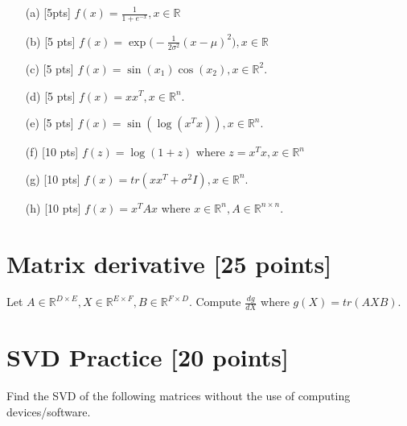 \begin{enumerate}
	\item [(a)] [5pts]  $f(x) = \frac{1}{1+e^{-x}}, x \in \mathbb{R}$
	
	\vspace{2mm} 

	\item[(b)]  [5 pts]  $f(x)= \exp \Big(-\frac{1}{2\sigma^2} (x-\mu)^2 \Big), x \in \mathbb{R}$
	
 
	 

	\item[(c)]  [5 pts]   $f(x)= \sin (x_1) \cos (x_2), x \in \mathbb{R}^2$.
	
	
	
	\item[(d)]  [5 pts]    $f(x) = xx^T, x \in \mathbb{R}^n$.

	\item[(e)]  [5 pts]    $f(x) = \sin( \log (x^T x)), x \in \mathbb{R}^n$.  
 
 	\item[(f)]  [10 pts]    $f(z)=\log(1+z)$ where $z=x^Tx, x \in \mathbb{R}^n$

 	\item[(g)]  [10 pts]    $f(x)=tr(xx^T+\sigma^2 I), x \in \mathbb{R}^n$.  
	
	\item[(h)] [10 pts] $f(x)=x^TAx$ where $x \in \mathbb{R}^n, A \in \mathbb{R}^{n \times n}$.
\end{enumerate}   

 

\section{Matrix derivative [25 points]}
 
 Let $A \in \mathbb{R}^{D \times E}, X \in  \mathbb{R}^{E \times F}, B \in  \mathbb{R}^{F \times D}$. Compute $\frac{dg}{dX}$ where  $g(X) = tr(AXB).$
 
 
\section{SVD Practice [20 points]}

Find the  SVD of the following matrices without the use of computing devices/software.


